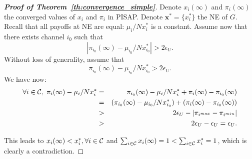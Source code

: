 \documentclass[12pt, onecolumn]{IEEEtran}
\theoremstyle{plain}
\theoremstyle{definition}
\begin{document}
\begin{proof}[\textbf{Proof of Theorem~\ref{th:convergence_simple}}]
Denote $x_i(\infty)$ and $\pi_i(\infty)$ the converged values of $x_i$ and $\pi_i$ in PISAP. Denote $\mathbf{x^*}=\{x_i^*\}$ the NE of $G$. Recall that all payoffs at NE are equal: $\mu_i/Nx_i^*$ is a constant. Assume now that there exists channel $i_0$ such that
$$|\pi_{i_0}(\infty)-\mu_{i_0}/Nx^*_{i_0}|>2\epsilon_U.$$
Without loss of generality, assume that
$$\pi_{i_0}(\infty)-\mu_{i_0}/Nx^*_{i_0}>2\epsilon_U.$$
We have now:
\begin{eqnarray*}
\forall i\in{\cal C}, \; \pi_i(\infty)-\mu_i/Nx_i^*&=&\pi_{i_0}(\infty)-\mu_i/Nx_i^*+\pi_i(\infty)-\pi_{i_0}(\infty) \\
&=&(\pi_{i_0}(\infty)-\mu_{i_0}/Nx_{i_0}^*)+(\pi_i(\infty)-\pi_{i_0}(\infty)) \\
&>&  2\epsilon_U - |\pi_{i^{max}}-\pi_{i^{min}}| \\
&>&2\epsilon_U-\epsilon_U = \epsilon_U.
\end{eqnarray*}

This leads to $x_i(\infty)<x_i^*, \forall i\in{\cal C}$ and $\sum_{i\in{\cal C}} x_i(\infty)=1<\sum_{i\in{\cal C}} x_i^*=1$, which is clearly a contradiction.
\end{proof}
\end{document}
